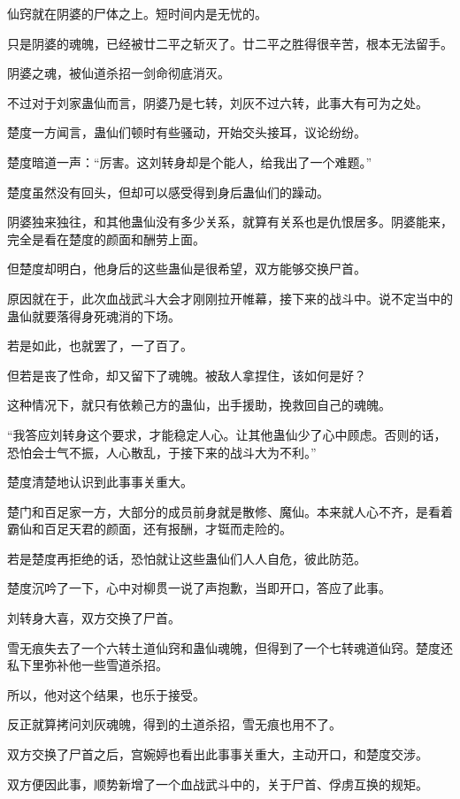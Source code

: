 \begin{this_body}
仙窍就在阴婆的尸体之上。短时间内是无忧的。

只是阴婆的魂魄，已经被廿二平之斩灭了。廿二平之胜得很辛苦，根本无法留手。

阴婆之魂，被仙道杀招一剑命彻底消灭。

不过对于刘家蛊仙而言，阴婆乃是七转，刘灰不过六转，此事大有可为之处。

楚度一方闻言，蛊仙们顿时有些骚动，开始交头接耳，议论纷纷。

楚度暗道一声：“厉害。这刘转身却是个能人，给我出了一个难题。”

楚度虽然没有回头，但却可以感受得到身后蛊仙们的躁动。

阴婆独来独往，和其他蛊仙没有多少关系，就算有关系也是仇恨居多。阴婆能来，完全是看在楚度的颜面和酬劳上面。

但楚度却明白，他身后的这些蛊仙是很希望，双方能够交换尸首。

原因就在于，此次血战武斗大会才刚刚拉开帷幕，接下来的战斗中。说不定当中的蛊仙就要落得身死魂消的下场。

若是如此，也就罢了，一了百了。

但若是丧了性命，却又留下了魂魄。被敌人拿捏住，该如何是好？

这种情况下，就只有依赖己方的蛊仙，出手援助，挽救回自己的魂魄。

“我答应刘转身这个要求，才能稳定人心。让其他蛊仙少了心中顾虑。否则的话，恐怕会士气不振，人心散乱，于接下来的战斗大为不利。”

楚度清楚地认识到此事事关重大。

楚门和百足家一方，大部分的成员前身就是散修、魔仙。本来就人心不齐，是看着霸仙和百足天君的颜面，还有报酬，才铤而走险的。

若是楚度再拒绝的话，恐怕就让这些蛊仙们人人自危，彼此防范。

楚度沉吟了一下，心中对柳贯一说了声抱歉，当即开口，答应了此事。

刘转身大喜，双方交换了尸首。

雪无痕失去了一个六转土道仙窍和蛊仙魂魄，但得到了一个七转魂道仙窍。楚度还私下里弥补他一些雪道杀招。

所以，他对这个结果，也乐于接受。

反正就算拷问刘灰魂魄，得到的土道杀招，雪无痕也用不了。

双方交换了尸首之后，宫婉婷也看出此事事关重大，主动开口，和楚度交涉。

双方便因此事，顺势新增了一个血战武斗中的，关于尸首、俘虏互换的规矩。


\end{this_body}
